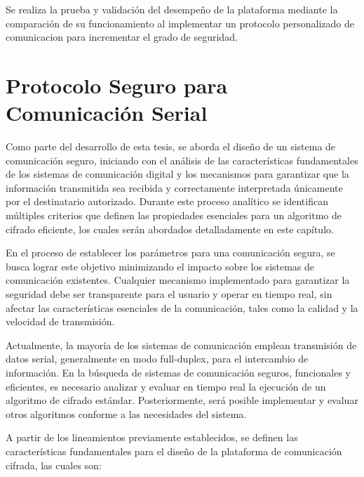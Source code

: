 Se realiza la prueba y validación del desempeño de la plataforma mediante la comparación de su funcionamiento al implementar un protocolo personalizado de comunicacion para incrementar el grado de seguridad.

\section{Protocolo Seguro para Comunicación Serial}
Como parte del desarrollo de esta tesis, se aborda el diseño de un sistema de comunicación seguro, iniciando con el análisis de las características fundamentales de los sistemas de comunicación digital y los mecanismos para garantizar que la información transmitida sea recibida y correctamente interpretada únicamente por el destinatario autorizado. Durante este proceso analítico se identifican múltiples criterios que definen las propiedades esenciales para un algoritmo de cifrado eficiente, los cuales serán abordados detalladamente en este capítulo.

En el proceso de establecer los parámetros para una comunicación segura, se busca lograr este objetivo minimizando el impacto sobre los sistemas de comunicación existentes. Cualquier mecanismo implementado para garantizar la seguridad debe ser transparente para el usuario y operar en tiempo real, sin afectar las características esenciales de la comunicación, tales como la calidad y la velocidad de transmisión.

Actualmente, la mayoría de los sistemas de comunicación emplean transmisión de datos serial, generalmente en modo full-duplex, para el intercambio de información. En la búsqueda de sistemas de comunicación seguros, funcionales y eficientes, es necesario analizar y evaluar en tiempo real la ejecución de un algoritmo de cifrado estándar. Posteriormente, será posible implementar y evaluar otros algoritmos conforme a las necesidades del sistema.

A partir de los lineamientos previamente establecidos, se definen las características fundamentales para el diseño de la plataforma de comunicación cifrada, las cuales son:



